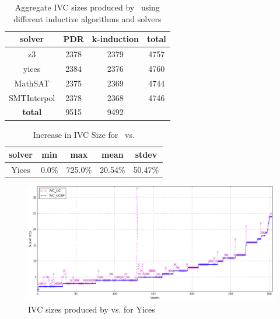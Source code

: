 \begin{table}
  \centering
  \begin{tabular}{ |c|c|c|c| }
    \hline
     solver & PDR & k-induction & \textbf{total} \\
    \hline
      z3 & 2378 & 2379 & 4757 \\
      yices & 2384 & 2376 & 4760 \\
      MathSAT & 2375 & 2369 & 4744 \\
      SMTInterpol & 2378 & 2368 & 4746 \\
    \hline
      \textbf{total} & 9515 & 9492 &   \\
    \hline
  \end{tabular}
  \caption{Aggregate IVC sizes produced by \ucalg\ using different inductive algorithms and solvers}
  \label{tab:minimality-algorithm-solvers}
\end{table}

\begin{table}
  \centering
  \begin{tabular}{ |c||c|c|c|c| }
    \hline
     solver & min & max & mean & stdev \\[0.5ex]
    \hline
    Yices &   0.0\%   & 725.0\% & 20.54\% & 50.47\% \\[0.5ex]
    \hline
  \end{tabular}
  \caption{Increase in IVC Size for \ucalg\ vs. \ucbfalg}
  \label{tab:overhead-ucbfalg}
\end{table}


\begin{figure}
  \centering
  \includegraphics[width=\textwidth]{figs/minimality.png} 
  \caption{IVC sizes produced by \ucalg vs. \ucbfalg for Yices}
  \label{fig:minimality-all}
\end{figure}

